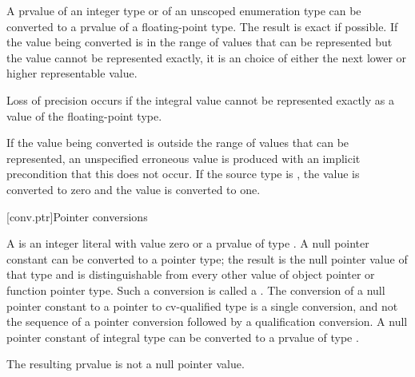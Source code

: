 \pnum
{}%
%
%
A prvalue of an integer type or of an unscoped enumeration type can be converted to
a prvalue of a floating-point type. The result is exact if possible. If the value being
converted is in the range of values that can be represented but the value cannot be
represented exactly, it is an  choice of either the next lower or higher representable
value.
\begin{note}
Loss of precision occurs if the integral value cannot be represented
exactly as a value of the floating-point type.
\end{note}
If the value being converted is
outside the range of values that can be represented,
an unspecified erroneous value is produced
with an implicit precondition that this does not occur.
%
%
%
%
%
If the
source type is , the value  is converted to zero and the value
 is converted to one.


[conv.ptr]{Pointer conversions}

\pnum
{}%
%
%
%
A  is an integer literal with
value zero
or a prvalue of type . A null pointer constant can be
converted to a pointer type; the
result is the null pointer value of that type and is
distinguishable from every other value of
object pointer or function pointer
type.
Such a conversion is called a .
The conversion of a null pointer constant to a pointer to
cv-qualified type is a single conversion, and not the sequence of a
pointer conversion followed by a qualification
conversion. A null pointer constant of integral type
can be converted to a prvalue of type .
\begin{note}
The resulting prvalue is not a null pointer value.
\end{note}


